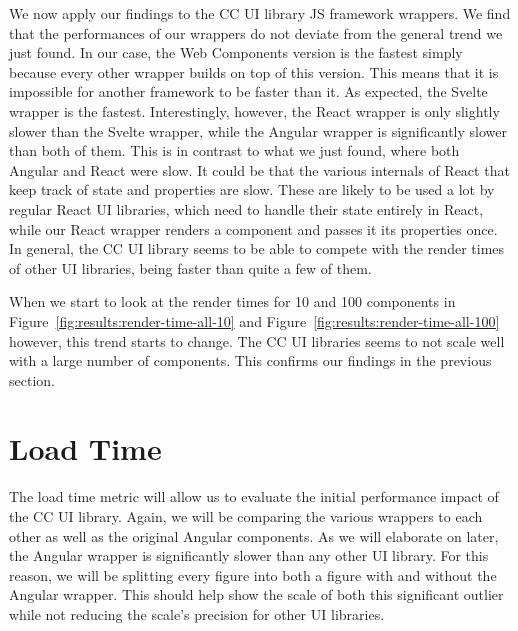 We now apply our findings to the CC UI library JS framework wrappers. We find that the performances of our wrappers do not deviate from the general trend we just found. In our case, the Web Components version is the fastest simply because every other wrapper builds on top of this version. This means that it is impossible for another framework to be faster than it. As expected, the Svelte wrapper is the fastest. Interestingly, however, the React wrapper is only slightly slower than the Svelte wrapper, while the Angular wrapper is significantly slower than both of them. This is in contrast to what we just found, where both Angular and React were slow. It could be that the various internals of React that keep track of state and properties are slow. These are likely to be used a lot by regular React UI libraries, which need to handle their state entirely in React, while our React wrapper renders a component and passes it its properties once. In general, the CC UI library seems to be able to compete with the render times of other UI libraries, being faster than quite a few of them.

When we start to look at the render times for 10 and 100 components in Figure~\ref{fig:results:render-time-all-10} and Figure~\ref{fig:results:render-time-all-100} however, this trend starts to change. The CC UI libraries seems to not scale well with a large number of components. This confirms our findings in the previous section.

\section{Load Time}
The load time metric will allow us to evaluate the initial performance impact of the CC UI library. Again, we will be comparing the various wrappers to each other as well as the original Angular components. As we will elaborate on later, the Angular wrapper is significantly slower than any other UI library. For this reason, we will be splitting every figure into both a figure with and without the Angular wrapper. This should help show the scale of both this significant outlier while not reducing the scale's precision for other UI libraries.

